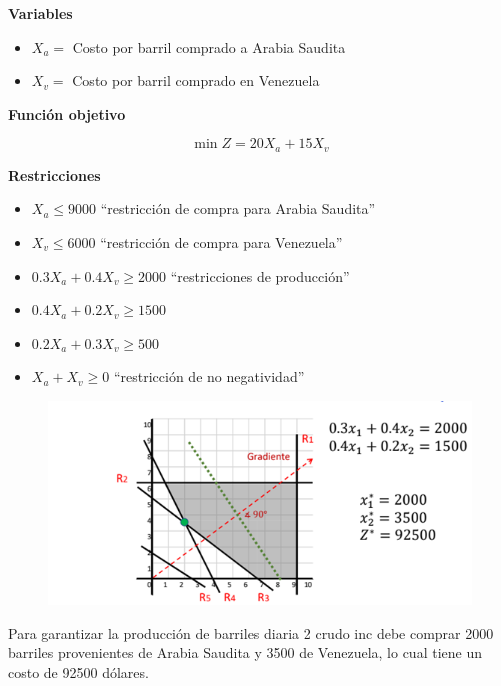 \documentclass[conference]{IEEEtran}
\begin{document}
\textbf{Variables}

\begin{itemize}
    \item $X_{a} = $ Costo por barril comprado a Arabia Saudita
    \item $X_{v} = $ Costo por barril comprado en Venezuela
\end{itemize}

\textbf{Función objetivo}

\begin{equation*}
    \min Z = 20X_{a} + 15X_{v}
\end{equation*}

\textbf{Restricciones}

\begin{itemize}
    \item $X_{a} \leq 9000$ ``restricción de compra para Arabia Saudita''
    \item $X_{v} \leq 6000$ ``restricción de compra para Venezuela''
    \item $0.3X_{a} + 0.4X_{v} \geq 2000$ ``restricciones de producción''
    \item $0.4X_{a} + 0.2X_{v} \geq 1500$
    \item $0.2X_{a} + 0.3X_{v} \geq 500$
    \item $X_{a} + X_{v} \geq 0$ ``restricción de no negatividad''
\end{itemize}

\begin{figure}[H]
    \begin{center}
        \includegraphics[width=\linewidth]{./Images/Caso-1_ImagenSolucion.png}
        \caption{}
    \end{center}
\end{figure}

Para garantizar la producción de barriles diaria 2 crudo inc debe comprar
2000 barriles provenientes de Arabia Saudita y 3500 de Venezuela, lo cual
tiene un costo de 92500 dólares.
\end{document}
